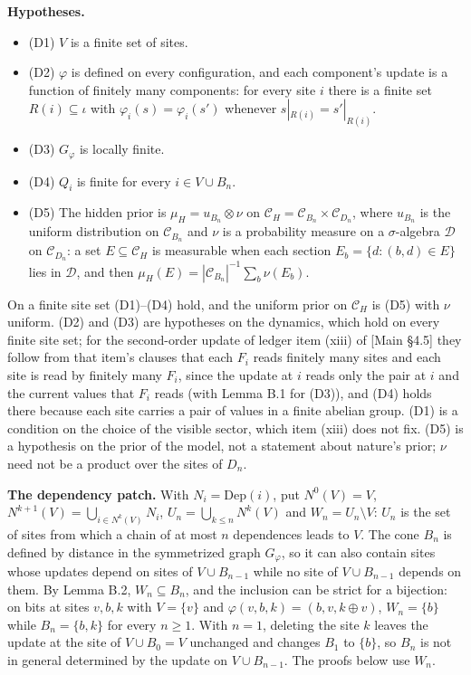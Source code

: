 \documentclass[
]{article}
\providecommand{\tightlist}{%
  \setlength{\itemsep}{0pt}\setlength{\parskip}{0pt}}
\begin{document}
\textbf{Hypotheses.}

\begin{itemize}
\tightlist
\item
  (D1) \(V\) is a finite set of sites.
\item
  (D2) \(\varphi\) is defined on every configuration, and each
  component's update is a function of finitely many components: for
  every site \(i\) there is a finite set \(R(i) \subseteq \iota\) with
  \(\varphi_i(s) = \varphi_i(s')\) whenever \(s|_{R(i)} = s'|_{R(i)}\).
\item
  (D3) \(G_\varphi\) is locally finite.
\item
  (D4) \(Q_i\) is finite for every \(i \in V \cup B_n\).
\item
  (D5) The hidden prior is \(\mu_H = u_{B_n} \otimes \nu\) on
  \(\mathcal{C}_H = \mathcal{C}_{B_n} \times \mathcal{C}_{D_n}\), where
  \(u_{B_n}\) is the uniform distribution on \(\mathcal{C}_{B_n}\) and
  \(\nu\) is a probability measure on a \(\sigma\)-algebra
  \(\mathcal{D}\) on \(\mathcal{C}_{D_n}\): a set
  \(E \subseteq \mathcal{C}_H\) is measurable when each section
  \(E_b = \{d : (b, d) \in E\}\) lies in \(\mathcal{D}\), and then
  \(\mu_H(E) = |\mathcal{C}_{B_n}|^{-1} \sum_{b} \nu(E_b)\).
\end{itemize}

On a finite site set (D1)--(D4) hold, and the uniform prior on
\(\mathcal{C}_H\) is (D5) with \(\nu\) uniform. (D2) and (D3) are
hypotheses on the dynamics, which hold on every finite site set; for the
second-order update of ledger item (xiii) of {[}Main §4.5{]} they follow
from that item's clauses that each \(F_i\) reads finitely many sites and
each site is read by finitely many \(F_i\), since the update at \(i\)
reads only the pair at \(i\) and the current values that \(F_i\) reads
(with Lemma B.1 for (D3)), and (D4) holds there because each site
carries a pair of values in a finite abelian group. (D1) is a condition
on the choice of the visible sector, which item (xiii) does not fix.
(D5) is a hypothesis on the prior of the model, not a statement about
nature's prior; \(\nu\) need not be a product over the sites of \(D_n\).

\textbf{The dependency patch.} With \(N_i = \mathrm{Dep}(i)\), put
\(N^0(V) = V\), \(N^{k+1}(V) = \bigcup_{i \in N^k(V)} N_i\),
\(U_n = \bigcup_{k \leq n} N^k(V)\) and \(W_n = U_n \setminus V\):
\(U_n\) is the set of sites from which a chain of at most \(n\)
dependences leads to \(V\). The cone \(B_n\) is defined by distance in
the symmetrized graph \(G_\varphi\), so it can also contain sites whose
updates depend on sites of \(V \cup B_{n-1}\) while no site of
\(V \cup B_{n-1}\) depends on them. By Lemma B.2, \(W_n \subseteq B_n\),
and the inclusion can be strict for a bijection: on bits at sites
\(v, b, k\) with \(V = \{v\}\) and
\(\varphi(v, b, k) = (b, v, k \oplus v)\), \(W_n = \{b\}\) while
\(B_n = \{b, k\}\) for every \(n \geq 1\). With \(n = 1\), deleting the
site \(k\) leaves the update at the site of \(V \cup B_0 = V\) unchanged
and changes \(B_1\) to \(\{b\}\), so \(B_n\) is not in general
determined by the update on \(V \cup B_{n-1}\). The proofs below use
\(W_n\).
\end{document}
